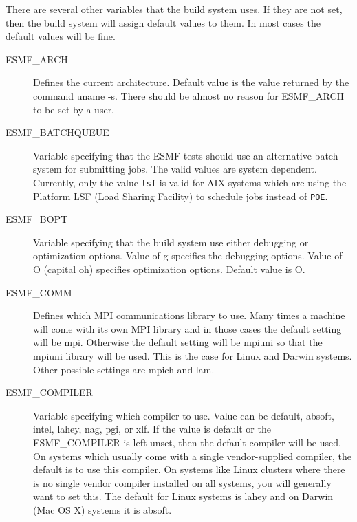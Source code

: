 \begin{itemize}
\begin{description}
\end{description}

There are several other variables that the build system uses.  If they
are not set, then the build system will assign default values to
them.  In most cases the default values will be fine.

\begin{description}

\item[ESMF\_ARCH] 

Defines the current architecture. Default value is the value returned
by the command uname -s.  There should be almost no reason for
ESMF\_ARCH to be set by a user.

\item[ESMF\_BATCHQUEUE] 

Variable specifying that the ESMF tests should use an alternative batch
system for submitting jobs.  The valid values are system dependent.
Currently, only the value {\tt lsf} is valid for AIX systems which 
are using the Platform LSF (Load Sharing Facility) to schedule jobs
instead of {\tt POE}.

\item[ESMF\_BOPT] 

Variable specifying that the build system use either debugging or
optimization options.  Value of g specifies the debugging options.
Value of O (capital oh) specifies optimization options.  Default value
is O.

\item[ESMF\_COMM]

Defines which MPI communications library to use.  Many times a machine
will come with its own MPI library and in those cases the default
setting will be mpi.  Otherwise the default setting will be mpiuni so
that the mpiuni library will be used.  This is the case for Linux and
Darwin systems.  Other possible settings are mpich and lam.

\item[ESMF\_COMPILER]

Variable specifying which compiler to use.  Value can be default,
absoft, intel, lahey, nag, pgi, or xlf.  If the value is default or the
ESMF\_COMPILER is left unset, then the default compiler will be
used. On systems which usually come with a single vendor-supplied
compiler, the default is to use this compiler.  On systems like
Linux clusters where there is no single vendor compiler installed
on all systems, you will generally want to set this.
The default for Linux systems is lahey and on Darwin (Mac OS X)
systems it is absoft.


\end{description}
\end{itemize}

